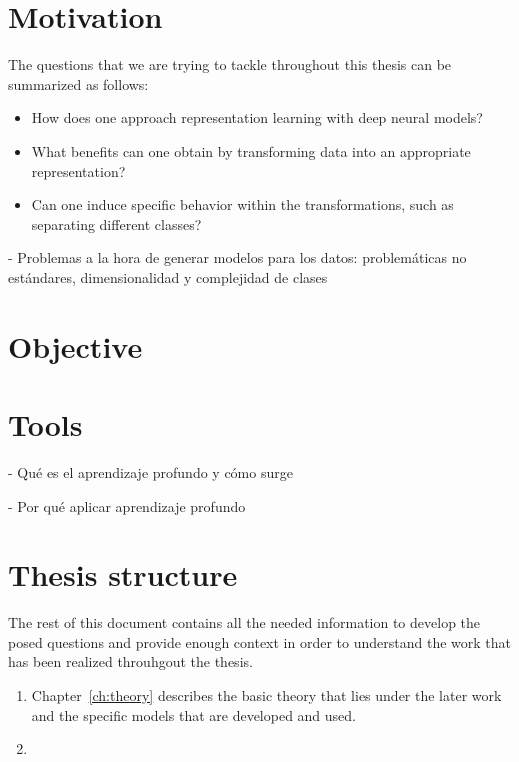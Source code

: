 \section{Motivation}

The questions that we are trying to tackle throughout this thesis can be summarized as follows:

\begin{itemize}
    \item How does one approach representation learning with deep neural models?
    \item What benefits can one obtain by transforming data into an appropriate representation?
    \item Can one induce specific behavior within the transformations, such as separating different classes?
\end{itemize}

- Problemas a la hora de generar modelos para los datos: problemáticas no estándares, dimensionalidad y complejidad de clases

\section{Objective}

\section{Tools}

- Qué es el aprendizaje profundo y cómo surge

- Por qué aplicar aprendizaje profundo

\section{Thesis structure}

The rest of this document contains all the needed information to develop the posed questions and provide enough context in order to understand the work that has been realized throuhgout the thesis.

\begin{enumerate}
    \item Chapter~\ref{ch:theory} describes the basic theory that lies under the later work and the specific models that are developed and used.
    \item {}
\end{enumerate}